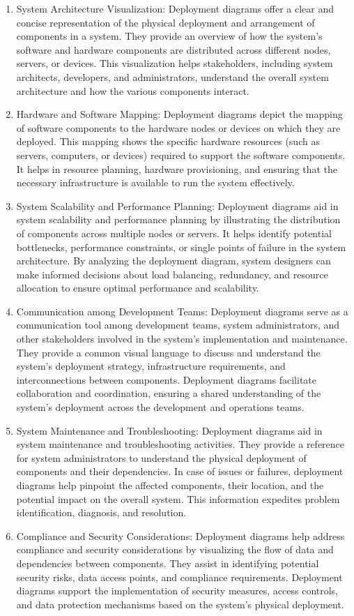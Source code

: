 \documentclass{article}
\begin{document}
\begin{enumerate}
    \item System Architecture Visualization: Deployment diagrams offer a clear and concise representation of the physical deployment and arrangement of components in a system. They provide an overview of how the system's software and hardware components are distributed across different nodes, servers, or devices. This visualization helps stakeholders, including system architects, developers, and administrators, understand the overall system architecture and how the various components interact.
    \item Hardware and Software Mapping: Deployment diagrams depict the mapping of software components to the hardware nodes or devices on which they are deployed. This mapping shows the specific hardware resources (such as servers, computers, or devices) required to support the software components. It helps in resource planning, hardware provisioning, and ensuring that the necessary infrastructure is available to run the system effectively.
    \item System Scalability and Performance Planning: Deployment diagrams aid in system scalability and performance planning by illustrating the distribution of components across multiple nodes or servers. It helps identify potential bottlenecks, performance constraints, or single points of failure in the system architecture. By analyzing the deployment diagram, system designers can make informed decisions about load balancing, redundancy, and resource allocation to ensure optimal performance and scalability.
    \item Communication among Development Teams: Deployment diagrams serve as a communication tool among development teams, system administrators, and other stakeholders involved in the system's implementation and maintenance. They provide a common visual language to discuss and understand the system's deployment strategy, infrastructure requirements, and interconnections between components. Deployment diagrams facilitate collaboration and coordination, ensuring a shared understanding of the system's deployment across the development and operations teams.
    \item System Maintenance and Troubleshooting: Deployment diagrams aid in system maintenance and troubleshooting activities. They provide a reference for system administrators to understand the physical deployment of components and their dependencies. In case of issues or failures, deployment diagrams help pinpoint the affected components, their location, and the potential impact on the overall system. This information expedites problem identification, diagnosis, and resolution.
    \item Compliance and Security Considerations: Deployment diagrams help address compliance and security considerations by visualizing the flow of data and dependencies between components. They assist in identifying potential security risks, data access points, and compliance requirements. Deployment diagrams support the implementation of security measures, access controls, and data protection mechanisms based on the system's physical deployment.
\end{enumerate}
\end{document}

